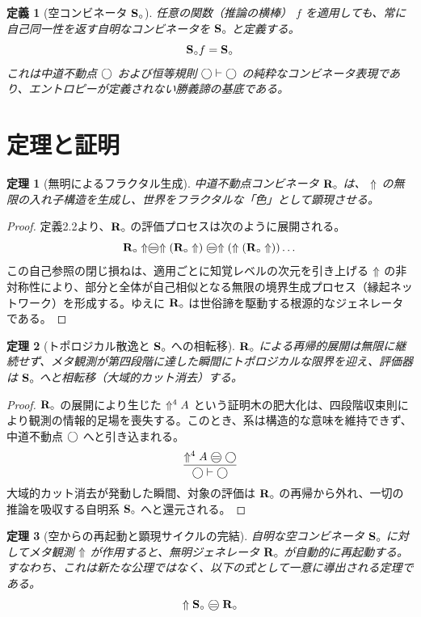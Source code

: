\documentclass[11pt,a4paper]{ltjsarticle}
\newtheorem{theorem}{定理}[section]
\newtheorem{definition}{定義}[section]
\begin{document}
\begin{definition}[空コンビネータ $\mathbf{S}_{\circ}$]
任意の関数（推論の横棒） $f$ を適用しても、常に自己同一性を返す自明なコンビネータを $\mathbf{S}_{\circ}$ と定義する。
\begin{equation}
\mathbf{S}_{\circ} f = \mathbf{S}_{\circ}
\end{equation}
これは中道不動点 $\bigcirc$ および恒等規則 $\bigcirc \vdash \bigcirc$ の純粋なコンビネータ表現であり、エントロピーが定義されない勝義諦の基底である。
\end{definition}

\section{定理と証明}

\begin{theorem}[無明によるフラクタル生成]
中道不動点コンビネータ $\mathbf{R}_{\circ}$ は、 $\Uparrow$ の無限の入れ子構造を生成し、世界をフラクタルな「色」として顕現させる。
\end{theorem}
\begin{proof}
定義2.2より、$\mathbf{R}_{\circ}$ の評価プロセスは次のように展開される。
\[ \Rmw \metanegation \mweq \metanegation (\Rmw \metanegation) \mweq \metanegation (\metanegation (\Rmw \metanegation)) \dots \]
この自己参照の閉じ損ねは、適用ごとに知覚レベルの次元を引き上げる $\Uparrow$ の非対称性により、部分と全体が自己相似となる無限の境界生成プロセス（縁起ネットワーク）を形成する。ゆえに $\mathbf{R}_{\circ}$ は世俗諦を駆動する根源的なジェネレータである。
\end{proof}

\begin{theorem}[トポロジカル散逸と $\mathbf{S}_{\circ}$ への相転移]
$\mathbf{R}_{\circ}$ による再帰的展開は無限に継続せず、メタ観測が第四段階に達した瞬間にトポロジカルな限界を迎え、評価器は $\mathbf{S}_{\circ}$ へと相転移（大域的カット消去）する。
\end{theorem}
\begin{proof}
$\mathbf{R}_{\circ}$ の展開により生じた $\Uparrow^4 A$ という証明木の肥大化は、四段階収束則により観測の情報的足場を喪失する。このとき、系は構造的な意味を維持できず、中道不動点 $\bigcirc$ へと引き込まれる。
\[ \frac{\metanegation^{4} A \mweq \dfix}{\dfix\vdash \dfix} \]
大域的カット消去が発動した瞬間、対象の評価は $\mathbf{R}_{\circ}$ の再帰から外れ、一切の推論を吸収する自明系 $\mathbf{S}_{\circ}$ へと還元される。
\end{proof}

\begin{theorem}[空からの再起動と顕現サイクルの完結]
自明な空コンビネータ $\mathbf{S}_{\circ}$ に対してメタ観測 $\Uparrow$ が作用すると、無明ジェネレータ $\mathbf{R}_{\circ}$ が自動的に再起動する。すなわち、これは新たな公理ではなく、以下の式として一意に導出される定理である。
\[ \metanegation \Svoid \mweq \Rmw \]
\end{theorem}
\end{document}
